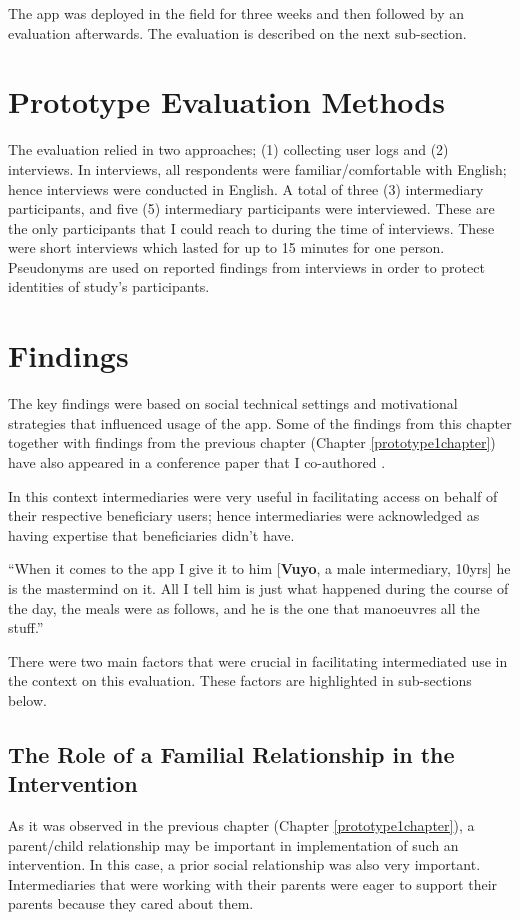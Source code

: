 The app was deployed in the field for three weeks and then followed by an evaluation afterwards. The evaluation is described on the next sub-section.
\section{Prototype Evaluation Methods}
The evaluation relied in two approaches; (1) collecting user logs and (2) interviews. In interviews, all respondents were familiar/comfortable with English; hence interviews were conducted in English. A total of three (3) intermediary participants, and five (5) intermediary participants were interviewed. These are the only participants that I could reach to during the time of interviews. These were short interviews which lasted  for up to 15 minutes for one person. Pseudonyms are used on reported findings from interviews in order to protect identities of study's participants. 
\section{Findings}
The key findings were based on social technical settings and motivational strategies that influenced usage of the app. Some of the findings from this chapter together with findings from the previous chapter (Chapter \ref{prototype1chapter}) have also appeared in a conference paper that I co-authored \citep{katule2016leveraging}.

In this context intermediaries were very useful in facilitating access on behalf of their respective beneficiary users; hence intermediaries were acknowledged as having expertise that beneficiaries didn't have. 

 {``When it comes to the app I give it to him [\textbf{Vuyo}, a male intermediary, 10yrs] he is the mastermind on it. All I tell him is just what happened during the course of the day, the meals were as follows, and he is the one that manoeuvres all the stuff.''} 

There were two main factors that were crucial in facilitating intermediated use in the context on this evaluation. These factors are highlighted in sub-sections below.

\subsection{The Role of a Familial Relationship in the Intervention}
As it was observed in the previous chapter (Chapter \ref{prototype1chapter}), a parent/child relationship may be important in implementation of such an intervention. In this case, a prior social relationship was also very important. Intermediaries that were working with their parents were eager to support their parents because they cared about them. 

